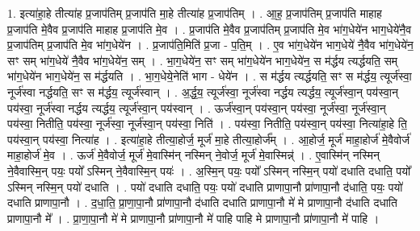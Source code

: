 \documentclass[17pt]{extarticle}
\begin{document}
1. इत्या॑हा॒हे तीत्या॑ह प्र॒जाप॑तिम् प्र॒जाप॑ति मा॒हे तीत्या॑ह प्र॒जाप॑तिम् । . आ॒ह॒ प्र॒जाप॑तिम् प्र॒जाप॑ति माहाह प्र॒जाप॑ति मे॒वैव प्र॒जाप॑ति माहाह प्र॒जाप॑ति मे॒व । . प्र॒जाप॑ति मे॒वैव प्र॒जाप॑तिम् प्र॒जाप॑ति मे॒व भा॑ग॒धेये॑न भाग॒धेये॑नै॒व प्र॒जाप॑तिम् प्र॒जाप॑ति मे॒व भा॑ग॒धेये॑न । . प्र॒जाप॑ति॒मिति॑ प्र॒जा - प॒ति॒म् । . ए॒व भा॑ग॒धेये॑न भाग॒धेये॑ नै॒वैव भा॑ग॒धेये॑न॒ सꣳ सम् भा॑ग॒धेये॑ नै॒वैव भा॑ग॒धेये॑न॒ सम् । . भा॒ग॒धेये॑न॒ सꣳ सम् भा॑ग॒धेये॑न भाग॒धेये॑न॒ स म॑र्द्धय त्यर्द्धयति॒ सम् भा॑ग॒धेये॑न भाग॒धेये॑न॒ स म॑र्द्धयति । . भा॒ग॒धेये॒नेति॑ भाग - धेये॑न । . स म॑र्द्धय त्यर्द्धयति॒ सꣳ स म॑र्द्धय॒ त्यूर्ज॑स्वा॒ नूर्ज॑स्वा नर्द्धयति॒ सꣳ स म॑र्द्धय॒ त्यूर्ज॑स्वान् । . अ॒र्द्ध॒य॒ त्यूर्ज॑स्वा॒ नूर्ज॑स्वा नर्द्धय त्यर्द्धय॒ त्यूर्ज॑स्वा॒न् पय॑स्वा॒न् पय॑स्वा॒ नूर्ज॑स्वा नर्द्धय त्यर्द्धय॒ त्यूर्ज॑स्वा॒न् पय॑स्वान् । . ऊर्ज॑स्वा॒न् पय॑स्वा॒न् पय॑स्वा॒ नूर्ज॑स्वा॒ नूर्ज॑स्वा॒न् पय॑स्वा॒ नितीति॒ पय॑स्वा॒ नूर्ज॑स्वा॒ नूर्ज॑स्वा॒न् पय॑स्वा॒ निति॑ । . पय॑स्वा॒ नितीति॒ पय॑स्वा॒न् पय॑स्वा॒ नित्या॑हा॒हे ति॒ पय॑स्वा॒न् पय॑स्वा॒ नित्या॑ह । . इत्या॑हा॒हे तीत्या॒होर्ज॒ मूर्ज॑ मा॒हे तीत्या॒होर्ज᳚म् । . आ॒होर्ज॒ मूर्ज॑ माहा॒होर्ज॑ मे॒वैवोर्ज॑ माहा॒होर्ज॑ मे॒व । . ऊर्ज॑ मे॒वैवोर्ज॒ मूर्ज॑ मे॒वास्मि॑न् नस्मिन् ने॒वोर्ज॒ मूर्ज॑ मे॒वास्मिन्न्॑ । . ए॒वास्मि॑न् नस्मिन् ने॒वैवास्मि॒न् पयः॒ पयो᳚ ऽस्मिन् ने॒वैवास्मि॒न् पयः॑ । . अ॒स्मि॒न् पयः॒ पयो᳚ ऽस्मिन् नस्मि॒न् पयो॑ दधाति दधाति॒ पयो᳚ ऽस्मिन् नस्मि॒न् पयो॑ दधाति । . पयो॑ दधाति दधाति॒ पयः॒ पयो॑ दधाति प्राणापा॒नौ प्रा॑णापा॒नौ द॑धाति॒ पयः॒ पयो॑ दधाति प्राणापा॒नौ । . द॒धा॒ति॒ प्रा॒णा॒पा॒नौ प्रा॑णापा॒नौ द॑धाति दधाति प्राणापा॒नौ मे॑ मे प्राणापा॒नौ द॑धाति दधाति प्राणापा॒नौ मे᳚ । . प्रा॒णा॒पा॒नौ मे॑ मे प्राणापा॒नौ प्रा॑णापा॒नौ मे॑ पाहि पाहि मे प्राणापा॒नौ प्रा॑णापा॒नौ मे॑ पाहि । \newline
\end{document}
